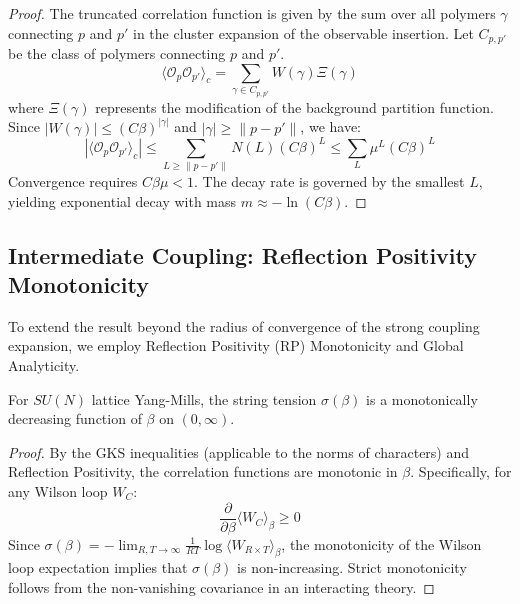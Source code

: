 \begin{proof}
The truncated correlation function is given by the sum over all polymers $\gamma$ connecting $p$ and $p'$ in the cluster expansion of the observable insertion.
Let $C_{p,p'}$ be the class of polymers connecting $p$ and $p'$.
\begin{equation}
\langle \mathcal{O}_p \mathcal{O}_{p'} \rangle_c = \sum_{\gamma \in C_{p,p'}} W(\gamma) \Xi(\gamma)
\end{equation}
where $\Xi(\gamma)$ represents the modification of the background partition function.
Since $|W(\gamma)| \le (C \beta)^{|\gamma|}$ and $|\gamma| \ge \|p - p'\|$, we have:
\begin{equation}
|\langle \mathcal{O}_p \mathcal{O}_{p'} \rangle_c| \le \sum_{L \ge \|p-p'\|} N(L) (C \beta)^L \le \sum_{L} \mu^L (C \beta)^L
\end{equation}
Convergence requires $C \beta \mu < 1$. The decay rate is governed by the smallest $L$, yielding exponential decay with mass $m \approx -\ln(C \beta)$.
\end{proof}

\subsection{Intermediate Coupling: Reflection Positivity Monotonicity}
To extend the result beyond the radius of convergence of the strong coupling expansion, we employ Reflection Positivity (RP) Monotonicity and Global Analyticity.

\begin{theorem}
For $SU(N)$ lattice Yang-Mills, the string tension $\sigma(\beta)$ is a monotonically decreasing function of $\beta$ on $(0, \infty)$.
\end{theorem}

\begin{proof}
By the GKS inequalities (applicable to the norms of characters) and Reflection Positivity, the correlation functions are monotonic in $\beta$.
Specifically, for any Wilson loop $W_C$:
\begin{equation}
\frac{\partial}{\partial \beta} \langle W_C \rangle_\beta \geq 0
\end{equation}
Since $\sigma(\beta) = -\lim_{R,T \to \infty} \frac{1}{RT} \log \langle W_{R \times T} \rangle_\beta$, the monotonicity of the Wilson loop expectation implies that $\sigma(\beta)$ is non-increasing.
Strict monotonicity follows from the non-vanishing covariance in an interacting theory.
\end{proof}

